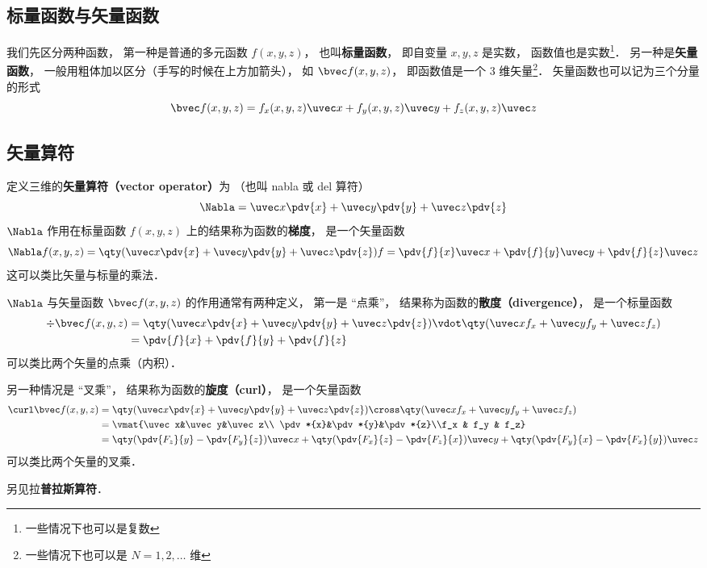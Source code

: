 

\subsection{标量函数与矢量函数}
我们先区分两种函数， 第一种是普通的多元函数 $f(x, y, z)$， 也叫\textbf{标量函数}， 即自变量 $x, y, z$ 是实数， 函数值也是实数\footnote{一些情况下也可以是复数}． 另一种是\textbf{矢量函数}， 一般用粗体加以区分（手写的时候在上方加箭头）， 如 $\bvec f(x, y, z)$， 即函数值是一个 3 维矢量\footnote{一些情况下也可以是 $N = 1, 2, \dots$ 维}． 矢量函数也可以记为三个分量的形式
\begin{equation}
\bvec f(x, y, z) = f_x(x, y, z) \uvec x + f_y(x, y, z) \uvec y + f_z(x, y, z) \uvec z
\end{equation}

\subsection{矢量算符}
定义三维的\textbf{矢量算符（vector operator）}为 （也叫 nabla 或 del 算符）
\begin{equation}
\Nabla = \uvec x \pdv{x} + \uvec y \pdv{y} + \uvec z \pdv{z}
\end{equation}
$\Nabla$ 作用在标量函数 $f(x, y, z)$ 上的结果称为函数的\textbf{梯度}， 是一个矢量函数
\begin{equation}
\Nabla f(x, y, z) = \qty(\uvec x \pdv{x} + \uvec y \pdv{y} + \uvec z \pdv{z}) f = \pdv{f}{x} \uvec x + \pdv{f}{y} \uvec y + \pdv{f}{z} \uvec z
\end{equation}
这可以类比矢量与标量的乘法．

$\Nabla$ 与矢量函数 $\bvec f(x, y, z)$ 的作用通常有两种定义， 第一是 “点乘”， 结果称为函数的\textbf{散度（divergence）}， 是一个标量函数
\begin{equation}
\begin{aligned}
\div \bvec f(x, y, z) &= \qty(\uvec x \pdv{x} + \uvec y \pdv{y} + \uvec z \pdv{z}) \vdot \qty(\uvec x f_x + \uvec y f_y + \uvec z f_z)\\
&= \pdv{f}{x} + \pdv{f}{y} + \pdv{f}{z}
\end{aligned}
\end{equation}
可以类比两个矢量的点乘（内积）．

另一种情况是 “叉乘”， 结果称为函数的\textbf{旋度（curl）}， 是一个矢量函数
\begin{equation}
\begin{aligned}
\curl \bvec f(x, y, z) &= \qty(\uvec x \pdv{x} + \uvec y \pdv{y} + \uvec z \pdv{z}) \cross \qty(\uvec x f_x + \uvec y f_y + \uvec z f_z)\\
&= \vmat{\uvec x&\uvec y&\uvec z\\ \pdv*{x}&\pdv*{y}&\pdv*{z}\\f_x & f_y & f_z}\\
&= \qty(\pdv{F_z}{y} - \pdv{F_y}{z})\uvec x + \qty(\pdv{F_x}{z} - \pdv{F_z}{x})\uvec y + \qty(\pdv{F_y}{x} - \pdv{F_x}{y})\uvec z
\end{aligned}
\end{equation}
可以类比两个矢量的叉乘．

另见拉\textbf{普拉斯算符}．
